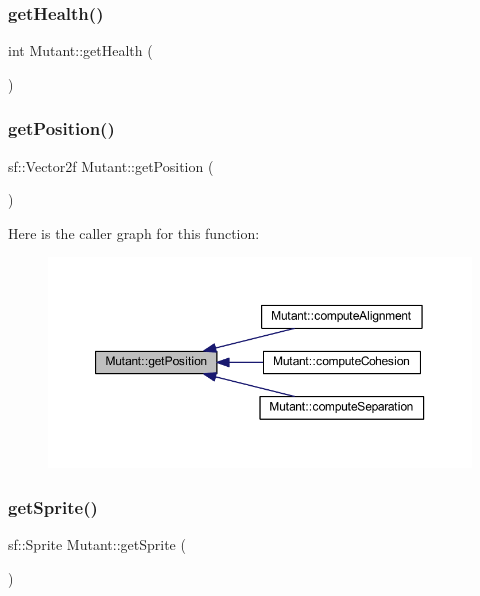 \mbox{\label{class_mutant_ae80452778ea58cf79ff76a1a481712af}} 
\subsubsection{\texorpdfstring{get\+Health()}{getHealth()}}
{\footnotesize\ttfamily int Mutant\+::get\+Health (\begin{DoxyParamCaption}{ }\end{DoxyParamCaption})}

\mbox{\label{class_mutant_ab20f22800bae3c7587beb641248412ac}} 
\subsubsection{\texorpdfstring{get\+Position()}{getPosition()}}
{\footnotesize\ttfamily sf\+::\+Vector2f Mutant\+::get\+Position (\begin{DoxyParamCaption}{ }\end{DoxyParamCaption})}

Here is the caller graph for this function\+:
\nopagebreak
\begin{figure}[H]
\begin{center}
\leavevmode
\includegraphics[width=350pt]{class_mutant_ab20f22800bae3c7587beb641248412ac_icgraph}
\end{center}
\end{figure}
\mbox{\label{class_mutant_a16d41479b4fabb6efef0a1af6a2df6ff}} 
\subsubsection{\texorpdfstring{get\+Sprite()}{getSprite()}}
{\footnotesize\ttfamily sf\+::\+Sprite Mutant\+::get\+Sprite (\begin{DoxyParamCaption}{ }\end{DoxyParamCaption})}

